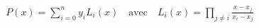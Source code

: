 \documentclass[preview]{standalone}
\begin{document}
\begin{align*}
P(x) = \sum_{i=0}^{n} y_i L_i(x) \quad \text{avec} \quad L_i(x) = \prod_{j \neq i} \frac{x - x_j}{x_i - x_j}
\end{align*}
\end{document}
